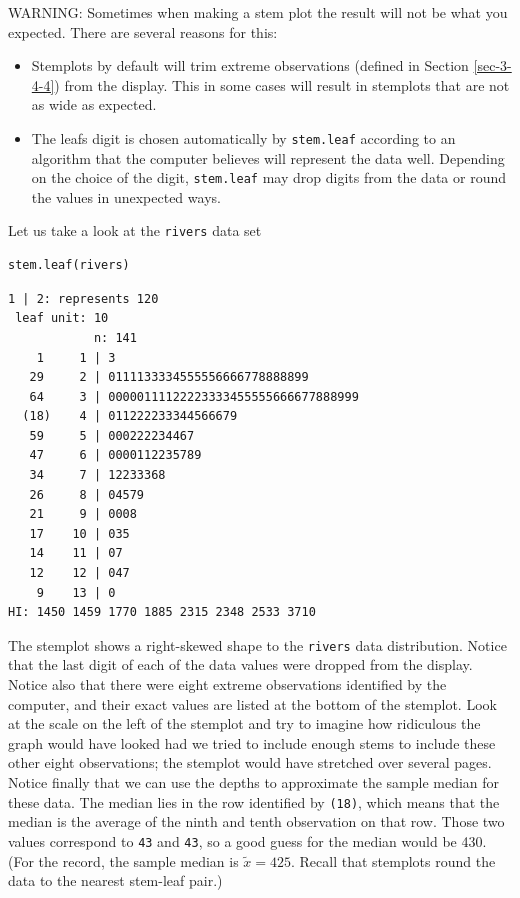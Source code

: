 \documentclass[captions=tableheading]{scrbook}
\begin{document}
WARNING: Sometimes when making a stem plot the result will not be what you expected. There are several reasons for this: 
\begin{itemize}
\item Stemplots by default will trim extreme observations (defined in Section \ref{sec-3-4-4}) from the display. This in some cases will result in stemplots that are not as wide as expected.
\item The leafs digit is chosen automatically by \texttt{stem.leaf} according to an algorithm that the computer believes will represent the data well. Depending on the choice of the digit, \texttt{stem.leaf} may drop digits from the data or round the values in unexpected ways.
\end{itemize}

Let us take a look at the \texttt{rivers} data set


\begin{verbatim}
stem.leaf(rivers)
\end{verbatim}


\begin{verbatim}
1 | 2: represents 120
 leaf unit: 10
            n: 141
    1     1 | 3
   29     2 | 0111133334555556666778888899
   64     3 | 00000111122223333455555666677888999
  (18)    4 | 011222233344566679
   59     5 | 000222234467
   47     6 | 0000112235789
   34     7 | 12233368
   26     8 | 04579
   21     9 | 0008
   17    10 | 035
   14    11 | 07
   12    12 | 047
    9    13 | 0
HI: 1450 1459 1770 1885 2315 2348 2533 3710
\end{verbatim}

The stemplot shows a right-skewed shape to the \texttt{rivers} data distribution. Notice that the last digit of each of the data values were dropped from the display. Notice also that there were eight extreme observations identified by the computer, and their exact values are listed at the bottom of the stemplot. Look at the scale on the left of the stemplot and try to imagine how ridiculous the graph would have looked had we tried to include enough stems to include these other eight observations; the stemplot would have stretched over several pages. Notice finally that we can use the depths to approximate the sample median for these data. The median lies in the row identified by \texttt{(18)}, which means that the median is the average of the ninth and tenth observation on that row. Those two values correspond to \texttt{43} and \texttt{43}, so a good guess for the median would be 430. (For the record, the sample median is \(\widetilde{x}=425\). Recall that stemplots round the data to the nearest stem-leaf pair.) 
\end{document}
